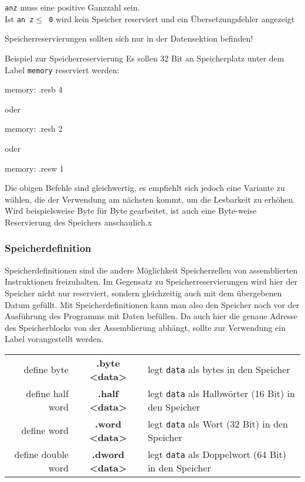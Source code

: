 \begin{warningblock}
	\texttt{anz} muss eine positive Ganzzahl sein.\\
	Ist \texttt{an z$\leq$ 0} wird kein Speicher reserviert und ein Übersetzungsfehler angezeigt
\end{warningblock}

\begin{warningblock}
	Speicherreservierungen sollten sich nur in der Datensektion befinden!
\end{warningblock}

\begin{exampleblock}{Beispiel zur Speicherreservierung}
	Es sollen 32 Bit an Speicherplatz unter dem Label \texttt{memory} reserviert werden:
	\begin{riscv}
	memory: .resb 4
	\end{riscv}
	oder
	\begin{riscv}
	memory: .resh 2
	\end{riscv}
	oder
	\begin{riscv}
	memory: .resw 1
	\end{riscv}
	Die obigen Befehle sind gleichwertig, es empfiehlt sich jedoch eine Variante zu wählen, die der Verwendung am nächsten kommt, um die Lesbarkeit zu erhöhen. Wird beispielsweise Byte für Byte gearbeitet, ist auch eine Byte-weise Reservierung des Speichers anschaulich.x
\end{exampleblock}

\subsubsection{Speicherdefinition}

Speicherdefinitionen sind die andere Möglichkeit Speicherzellen von
assemblierten Instruktionen freizuhalten. Im Gegensatz zu Speicherreservierungen
wird hier der Speicher nicht nur reserviert, sondern gleichzeitig auch mit dem
übergebenen Datum gefüllt. Mit Speicherdefinitionen kann man also den Speicher
noch vor der Ausführung des Programms mit Daten befüllen. Da auch hier die
genaue Adresse des Speicherblocks von der Assemblierung abhängt, sollte zur
Verwendung ein Label vorangestellt werden.\\

\begin{centering}
	\begin{tabular}{rcl}
		define byte & \textbf{.byte <data>} & legt \texttt{data} als bytes in den Speicher\\
		define half word & \textbf{.half <data>} & legt \texttt{data} als Halbwörter (16 Bit) in den Speicher\\
		define word & \textbf{.word <data>} & legt \texttt{data} als Wort (32 Bit) in den Speicher\\
		define double word & \textbf{.dword <data>} & legt \texttt{data} als Doppelwort (64 Bit) in den Speicher\\
	\end{tabular}
\end{centering}

